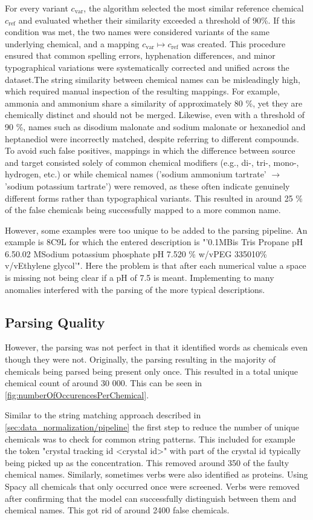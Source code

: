 For every variant $c_\text{var}$, the algorithm selected the most similar reference chemical $c_\text{ref}$ and evaluated whether their similarity exceeded a threshold of 90\%. If this condition was met, the two names were considered variants of the same underlying chemical, and a mapping $c_\text{var} \mapsto c_\text{ref}$ was created. This procedure ensured that common spelling errors, hyphenation differences, and minor typographical variations were systematically corrected and unified across the dataset.The string similarity between chemical names can be misleadingly high, which required manual inspection of the resulting mappings. For example, ammonia and ammonium share a similarity of approximately 80 \%, yet they are chemically distinct and should not be merged. Likewise, even with a threshold of 90 \%, names such as disodium malonate and sodium malonate or hexanediol and heptanediol were incorrectly matched, despite referring to different compounds. To avoid such false positives, mappings in which the difference between source and target consisted solely of common chemical modifiers (e.g., di-, tri-, mono-, hydrogen, etc.) or while chemical names ('sodium ammonium tartrate' $\rightarrow$ 'sodium potassium tartrate') were removed, as these often indicate genuinely different forms rather than typographical variants. This resulted in around 25 \% of the false chemicals being successfully mapped to a more common name. 

However, some examples were too unique to be added to the parsing pipeline. An example is 8C9L for which the entered description is "'0.1MBis Tris Propane pH 6.50.02 MSodium potassium phosphate pH 7.520 \% w/vPEG 335010\% v/vEthylene glycol'". Here the problem is that after each numerical value a space is missing not being clear if a pH of 7.5 is meant. Implementing to many anomalies interfered with the parsing of the more typical descriptions. 

\subsection{Parsing Quality}
However, the parsing was not perfect in that it identified words as chemicals even though they were not. Originally, the parsing resulting in the majority of chemicals being parsed being present only once. This resulted in a total unique chemical count of around 30 000. This can be seen in \autoref{fig:numberOfOccurencesPerChemical}.

Similar to the string matching approach described in \autoref{sec:data_normalization/pipeline} the first step to reduce the number of unique chemicals was to check for common string patterns. This included for example the token "crystal tracking id <crystal id>" with part of the crystal id typically being picked up as the concentration. This removed around 350 of the faulty chemical names. Similarly, sometimes verbs were also identified as proteins. Using Spacy all chemicals that only occurred once were screened. Verbs were removed after confirming that the model can successfully distinguish between them and chemical names. This got rid of around 2400 false chemicals.  

